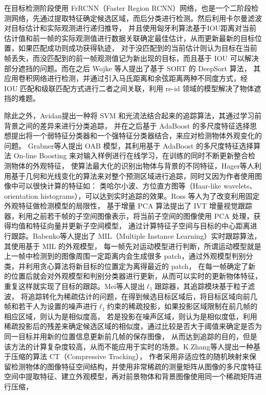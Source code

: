 在目标检测阶段使用 FrRCNN（Faster Region RCNN）网络，也是一个二阶段检测网络，先通过提取特征确定候选区域，而后分类进行检测。然后利用卡尔曼滤波对目标估计和实际观测进行递归推导，
并且使用匈牙利算法基于IOU距离对当前估计值和前一帧的实际观测值进行数据关联确定最佳估计，从而更新最新的目标位置，如果匹配成功则成功获得轨迹，
对于没匹配到的当前估计则认为目标在当前帧丢失，而没匹配到的前一帧观测值记为新出现的目标，而且基于 IOU 可以解决部分遮挡的问题。而在之后 Wojke 等人提出了基于 SORT 的 DeepSort 算法，
其应用卷积网络进行检测，并通过引入马氏距离和余弦距离两种不同度方式，经 IOU 匹配和级联匹配方式进行二者之间关联，利用 re-id 领域的模型解决了物体遮挡的难题。

除此之外，Avidan\cite{60}提出一种将 SVM 和光流法结合起来的追踪算法，其通过学习前背景之间的差异来进行分类追踪，
并在之后基于 AdaBoost 的多尺度特征选择思想\cite{61}提出将一个弱特征分类器和一个强特征分类器结合，来应对检测物体外观变化的问题。
Grabner等人\cite{62}提出 OAB 模型，其利用基于 AdaBoost 的多尺度特征选择算法 On-line Boosting 来对输入样例进行在线学习，在训练的同时不断更新整合检测物体的外观特征，
使算法最大化的识别出物体与背景的不同特征，Hager等人\cite{63}利用基于几何和光线变化的算法来对整个预测区域进行追踪，同时又因为作者使用图像中可以很快计算的特征如：
类哈尔小波、方位直方图等（Haar-like wavelets、orientation histograms），可以达到实时追踪的效果。Ross 等人\cite{64}为了改变利用固定外观特征做检测模型的局限性，
基于增量 PCA 算法提出了 IVT 增量视觉跟踪器，利用之前若干帧的子空间图像表示，将当前子空间的图像使用 PCA 处理，获得均值和特征向量并更新子空间模型，
通过计算特征子空间与目标的中心距离进行跟踪。Babenko等人\cite{65,66}提出了 MIL（Multiple Instance Learning）实时跟踪算法，其使用基于 MIL 的外观模型，
每一帧先对运动模型进行判断，所谓运动模型就是上一帧中检测到的图像周围一定距离内会生成很多 patch，通过外观模型判别分类，并利用贪心算法将新目标的位置定为离得最近的 patch，
在每一帧确定了新的位置后就会对外观模型和判别分类器进行更新，从而可以实时的更新物体特征，重复这样就实现了目标的跟踪。Mei等人\cite{67}提出$\ell_1$跟踪器，其追踪模块基于粒子滤波，
将追踪转化为稀疏估计的问题，在得到候选目标区域后，将目标区域向前几帧和若干人为设置的噪声进行$\ell_1$约束的稀疏投影，如果投影区域限制在前几帧的相应区域，则认为是相似度高，
若是投影在噪声区域，则认为是相似度低，利用稀疏投影后的残差来确定候选区域的相似度，通过比较是否大于阈值来确定是否为同一目标并用新的位置信息更新前几帧的保存图像，
从而达到追踪的目的，但是该方法的计算复杂度较高，从而不能应用于实时的场景。K.Zhang等人\cite{68}提出一种基于压缩的算法 CT（Compressive Tracking），
作者采用非适应性的随机映射来保留检测物体的图像特征空间结构，并使用非常稀疏的测量矩阵从图像的多尺度特征空间中提取特征、建立外观模型，再对前景物体和背景图像使用同一个稀疏矩阵进行压缩，
